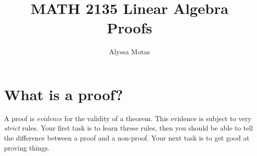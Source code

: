 \documentclass[11pt]{article}
\title{\textbf{MATH 2135 Linear Algebra} \\ Proofs}
\author{Alyssa Motas}
\begin{document}
    \maketitle

    \pagebreak

    \tableofcontents

    \pagebreak

    \section{What is a proof?}

    A proof is \emph{evidence} for the validity of a theorem. This evidence is subject to very \emph{strict} rules. Your first task is to learn threse rules, then you should be able to tell the difference between a proof and a non-proof. Your next task is to get good at proving things.
\end{document}
